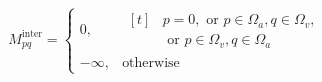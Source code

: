 \begin{equation}
\label{eq:inter-mask}
\begin{aligned} {M}_{pq}^{\mathrm{inter}}=\left\{\begin{array}{ll}0,&\begin{aligned}[t] &p=0,\text{ or }p\in {\Omega}_{a},q\in {\Omega}_{v},\\ &\text{ or }p\in {\Omega}_{v},q\in {\Omega}_{a}\end{aligned}\\-\infty,&\text{otherwise}\end{array}\right.\end{aligned}
\end{equation}
